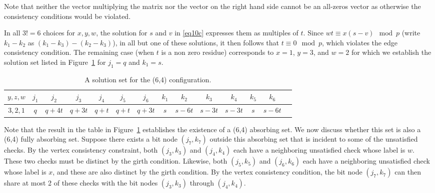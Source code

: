 {Note that neither the vector multiplying the matrix nor the vector
on the right hand side cannot be an all-zeros vector as otherwise
the consistency conditions would be violated.

In all $3!=6$ choices for $x,y,w$, the solution for $s$ and $v$ in
\eqref{eq10c} expresses them as multiples of $t$. Since $wt \equiv
x(s-v) \mod p$ (write $k_1-k_2$ as $(k_1-k_3)-(k_2-k_3)$), in all
but one of these solutions, it then follows that $t \equiv 0 \mod
p$, which violates the edge consistency condition. The remaining
case (when $t$ is a non zero residue) corresponds to $x=1$, $y=3$,
and $w=2$ for which we establish the solution set listed in
Figure~\ref{table64b} for $j_1=q$ and $k_1=s$.

\hspace{-0.2in}\small{\hspace{-0.2in}\begin{table}[ht]\vspace{-0.05in}\hspace{-0.2in}
\begin{tabular}{|c |c|c|c|c|c|c|c|c|c|c|c|c|c|}
  \hline
  $y,z,w$ & $j_1$ & $j_2$ & $j_3$ & $j_4$ & $j_5$ & $j_6$ & $k_1$ & $k_2$ & $k_3$ & $k_4$ & $k_5$ & $k_6$ \\
  \hline
$3,2,1$&  $q$ & $q+4t$ &  $q+3t$ &  $q+t$ &  $q+t$ & $q+3t$ & $s$
& $s-6t$ & $s-3t$ & $s-3t$ & $s$ &
  $s-6t$\\
  \hline
\end{tabular}
\caption{ A solution set for the (6,4)
configuration.}\label{table64b}
\end{table}}
\normalsize

Note that the result in the table in Figure~\ref{table64b}
establishes the existence of a (6,4) absorbing set. We now discuss
whether this set is also a (6,4) fully absorbing set. Suppose
there exists a bit node $(j_7,k_7)$ outside this absorbing set
that is incident to some of the unsatisfied checks. By the vertex
consistency constraint, both $(j_3,k_3)$ and $(j_4,k_4)$ each have
a neighboring unsatisfied check whose label is $w$. These two
checks must be distinct by the girth condition. Likewise, both
$(j_5,k_5)$ and $(j_6,k_6)$ each have a neighboring unsatisfied
check whose label is $x$, and these are also distinct by the girth
condition. By the vertex consistency condition, the bit node
$(j_7,k_7)$ can then share at most 2 of these checks with the bit
nodes $(j_3,k_3)$ through $(j_4,k_4)$.

}
